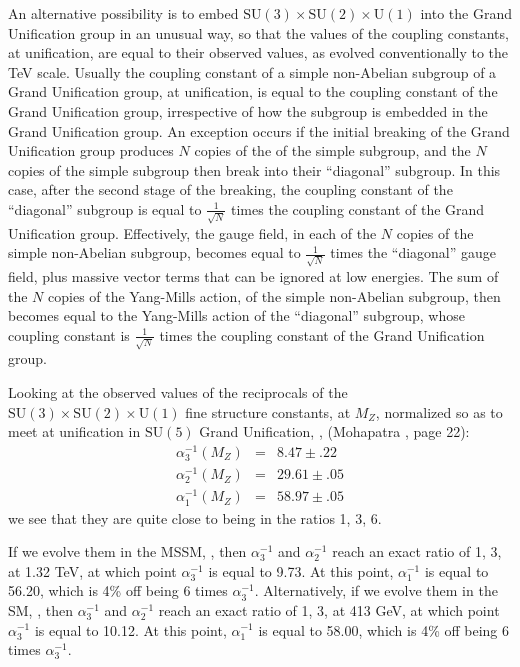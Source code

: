 \documentclass[a4paper,12pt,oneside]{article}
\begin{document}
An alternative possibility is to embed $\mathrm{SU}(3)\times
\mathrm{SU}(2)\times\mathrm{U}(1)$ into the Grand Unification group
in an unusual way, so that the values of the coupling constants, at 
unification, are equal to their observed values, as evolved 
conventionally to the TeV scale.  Usually the coupling constant of
a simple non-Abelian subgroup of a Grand Unification group, at
unification, is equal to the coupling constant of the Grand
Unification group, irrespective of how the subgroup is embedded
in the Grand Unification group.  An exception occurs \cite{Benakli, 
ACG} if 
the initial breaking of the Grand Unification group produces $N$ 
copies of the of the simple subgroup, and the $N$ copies of the 
simple subgroup then break into their ``diagonal'' subgroup.  In 
this case, after the second stage of the breaking, the coupling 
constant of the ``diagonal'' subgroup is equal to 
$\frac{1}{\sqrt{N}}$ times the coupling constant of the Grand
Unification group.  Effectively, the gauge field, in each of the
$N$ copies of the simple non-Abelian subgroup, becomes equal to
$\frac{1}{\sqrt{N}}$ times the ``diagonal'' gauge field, plus 
massive vector terms that can be ignored at low energies.  The sum
of the $N$ copies of the Yang-Mills action, of the simple 
non-Abelian subgroup, then becomes equal to the Yang-Mills action of
the ``diagonal'' subgroup, whose coupling constant is 
$\frac{1}{\sqrt{N}}$ times the coupling constant of the Grand
Unification group.

Looking at the observed values of the reciprocals of the 
$\mathrm{SU}(3)\times\mathrm{SU}(2)\times\mathrm{U}(1)$ fine 
structure constants, at $M_Z$, normalized so as to meet at 
unification in $\mathrm{SU}(5)$ Grand Unification, \cite{GG}, 
(Mohapatra \cite{Mohapatra}, page 22):
\begin{equation}\label{fine structure constant reciprocals}
\begin{array}{ccc}
\alpha_3^{-1}(M_Z) & = & 8.47\pm.22 \\
\alpha_2^{-1}(M_Z) & = & 29.61\pm.05 \\
\alpha_1^{-1}(M_Z) & = & 58.97\pm.05
\end{array}
\end{equation}
we see that they are quite close to being in the ratios 1, 3, 6.

If we evolve them in the MSSM, \cite{Mohapatra}, then 
$\alpha_3^{-1}$ and
$\alpha_2^{-1}$ reach an exact ratio of 1, 3, at 1.32 TeV, at which
point $\alpha_3^{-1}$ is equal to 9.73.  At this point, 
$\alpha_1^{-1}$ is equal to 56.20, which is 4\% off being 6 times
$\alpha_3^{-1}$.  Alternatively, if we evolve them in the SM,
\cite{Rosner}, then $\alpha_3^{-1}$ and $\alpha_2^{-1}$ reach an 
exact ratio of 1, 3, at 413 GeV, at which point $\alpha_3^{-1}$ is
equal to 10.12.  At this point, $\alpha_1^{-1}$ is equal to 58.00,
which is 4\% off being 6 times $\alpha_3^{-1}$.
\end{document}
